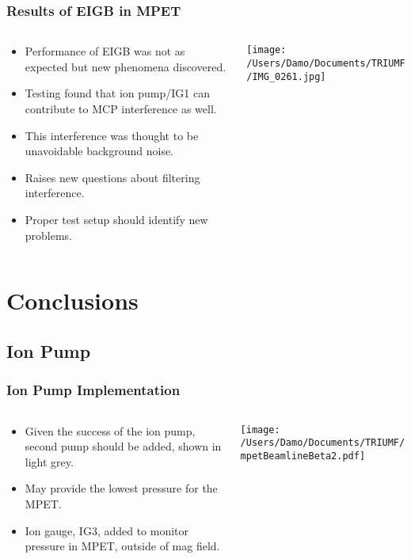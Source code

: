 \documentclass{beamer}
\begin{document}
{
  \frametitle{Results of EIGB in MPET}
  \begin{columns}[T]
    \begin{column}{0.50\textwidth}
      \begin{itemize}
        \item<1>Performance of EIGB was not as expected but new phenomena discovered.
        \item<1>Testing found that ion pump/IG1 can contribute to MCP interference as well.
        \item<1>This interference was thought to be unavoidable background noise.
        \item<1>Raises new questions about filtering interference.
        \item<1>Proper test setup should identify new problems.
      \end{itemize}
    \end{column}
    \begin{column}{0.50\textwidth}
    \texttt{[image: /Users/Damo/Documents/TRIUMF/IMG\_0261.jpg]}
    \end{column}
  \end{columns}
}
\section{Conclusions}
\subsection{Ion Pump}
\frame
{
  \frametitle{Ion Pump Implementation}
  \begin{columns}[T]
    \begin{column}{0.450\textwidth}
      \begin{itemize}
        \item<1> Given the success of the ion pump, second pump should be added, shown in light grey.
        \item<1> May provide the lowest pressure for the MPET.
        \item<1> Ion gauge, IG3, added to monitor pressure in MPET, outside of mag field.
      \end{itemize}
    \end{column}
    \begin{column}{0.550\textwidth}
    \texttt{[image: /Users/Damo/Documents/TRIUMF/mpetBeamlineBeta2.pdf]}
    \end{column}
  \end{columns}
}
\end{document}
